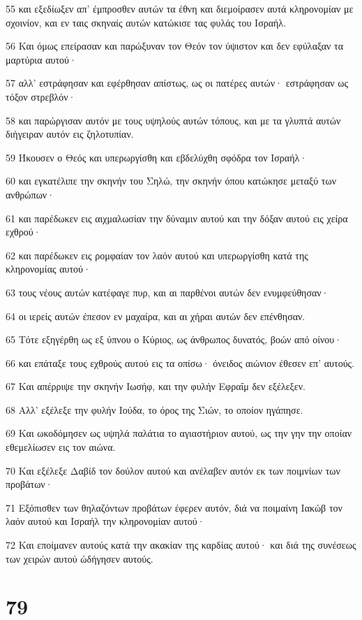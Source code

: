 \par 55 και εξεδίωξεν απ' έμπροσθεν αυτών τα έθνη και διεμοίρασεν αυτά κληρονομίαν με σχοινίον, και εν ταις σκηναίς αυτών κατώκισε τας φυλάς του Ισραήλ.
\par 56 Και όμως επείρασαν και παρώξυναν τον Θεόν τον ύψιστον και δεν εφύλαξαν τα μαρτύρια αυτού·
\par 57 αλλ' εστράφησαν και εφέρθησαν απίστως, ως οι πατέρες αυτών· εστράφησαν ως τόξον στρεβλόν·
\par 58 και παρώργισαν αυτόν με τους υψηλούς αυτών τόπους, και με τα γλυπτά αυτών διήγειραν αυτόν εις ζηλοτυπίαν.
\par 59 Ήκουσεν ο Θεός και υπερωργίσθη και εβδελύχθη σφόδρα τον Ισραήλ·
\par 60 και εγκατέλιπε την σκηνήν του Σηλώ, την σκηνήν όπου κατώκησε μεταξύ των ανθρώπων·
\par 61 και παρέδωκεν εις αιχμαλωσίαν την δύναμιν αυτού και την δόξαν αυτού εις χείρα εχθρού·
\par 62 και παρέδωκεν εις ρομφαίαν τον λαόν αυτού και υπερωργίσθη κατά της κληρονομίας αυτού·
\par 63 τους νέους αυτών κατέφαγε πυρ, και αι παρθένοι αυτών δεν ενυμφεύθησαν·
\par 64 οι ιερείς αυτών έπεσον εν μαχαίρα, και αι χήραι αυτών δεν επένθησαν.
\par 65 Τότε εξηγέρθη ως εξ ύπνου ο Κύριος, ως άνθρωπος δυνατός, βοών από οίνου·
\par 66 και επάταξε τους εχθρούς αυτού εις τα οπίσω· όνειδος αιώνιον έθεσεν επ' αυτούς.
\par 67 Και απέρριψε την σκηνήν Ιωσήφ, και την φυλήν Εφραΐμ δεν εξέλεξεν.
\par 68 Αλλ' εξέλεξε την φυλήν Ιούδα, το όρος της Σιών, το οποίον ηγάπησε.
\par 69 Και ωκοδόμησεν ως υψηλά παλάτια το αγιαστήριον αυτού, ως την γην την οποίαν εθεμελίωσεν εις τον αιώνα.
\par 70 Και εξέλεξε Δαβίδ τον δούλον αυτού και ανέλαβεν αυτόν εκ των ποιμνίων των προβάτων·
\par 71 Εξόπισθεν των θηλαζόντων προβάτων έφερεν αυτόν, διά να ποιμαίνη Ιακώβ τον λαόν αυτού και Ισραήλ την κληρονομίαν αυτού·
\par 72 Και εποίμανεν αυτούς κατά την ακακίαν της καρδίας αυτού· και διά της συνέσεως των χειρών αυτού ώδήγησεν αυτούς.

\chapter{79}

